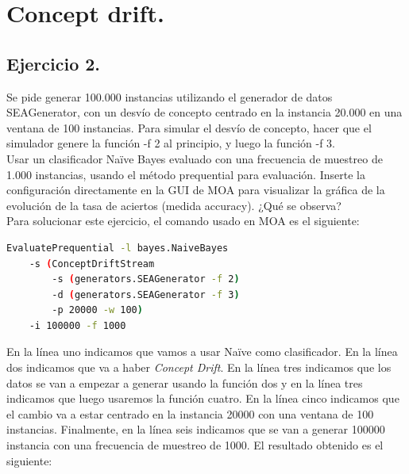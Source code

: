 \documentclass[11pt]{article}
\begin{document}
\section{Concept drift.}

\subsection{Ejercicio 2.}

Se pide generar 100.000 instancias utilizando el generador de datos SEAGenerator, con un desvío de concepto centrado en la instancia 20.000 en una ventana de 100 instancias. Para simular el desvío de concepto, hacer que el simulador genere la función -f 2 al principio, y luego la función -f 3. \\ Usar un clasificador Na\"{i}ve Bayes evaluado con una frecuencia de muestreo de 1.000 instancias, usando el método prequential para evaluación. Inserte la configuración directamente en la GUI de MOA para visualizar la gráfica de la evolución de la tasa de aciertos (medida accuracy). ¿Qué se observa? \\

Para solucionar este ejercicio, el comando usado en MOA es el siguiente:

\begin{lstlisting}[language=bash]
EvaluatePrequential -l bayes.NaiveBayes
	-s (ConceptDriftStream 
		-s (generators.SEAGenerator -f 2) 
		-d (generators.SEAGenerator -f 3) 
		-p 20000 -w 100)
	-i 100000 -f 1000
\end{lstlisting}

En la línea uno indicamos que vamos a usar Na\"{i}ve como clasificador. En la línea dos indicamos que va a haber \textit{Concept Drift}. En la línea tres indicamos que los datos se van a empezar a generar usando la función dos y en la línea tres indicamos que luego usaremos la función cuatro. En la línea cinco indicamos que el cambio va a estar centrado en la instancia 20000 con una ventana de 100 instancias. Finalmente, en la línea seis indicamos que se van a generar 100000 instancia con una frecuencia de muestreo de 1000. El resultado obtenido es el siguiente:
\end{document}
